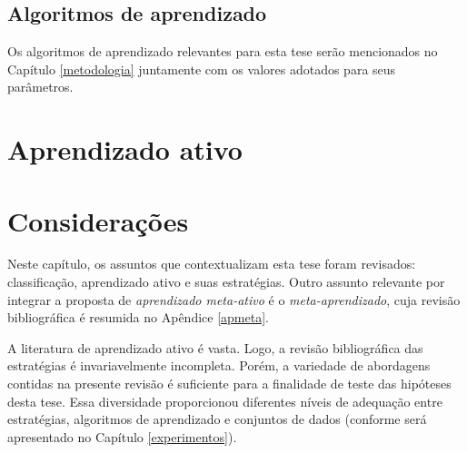   






% 
% 
% 
% 
% 
%  
% 
% 
% 
% 
% 
% 
% 
% 
% 
% 
% 
% 
% 
% 
% 
% 
% 



\subsection{Algoritmos de aprendizado}\label{algs}
Os algoritmos de aprendizado relevantes para esta tese serão mencionados no Capítulo \ref{metodologia} juntamente com os valores adotados para seus parâmetros.

\section{Aprendizado ativo} \label{aprendizado-ativo}


\section{Considerações}\label{contcons}
Neste capítulo, os assuntos que contextualizam esta tese foram revisados:
classificação, aprendizado ativo e suas estratégias.
Outro assunto relevante por integrar a proposta de \textit{aprendizado meta-ativo} é o \textit{meta-aprendizado}, cuja revisão bibliográfica é resumida no Apêndice \ref{apmeta}.

A literatura de aprendizado ativo é vasta.
Logo, a revisão bibliográfica das estratégias é invariavelmente incompleta.
Porém, a variedade de abordagens contidas na presente revisão é suficiente para a finalidade de teste das hipóteses desta tese.
Essa diversidade proporcionou diferentes níveis de adequação entre estratégias, algoritmos de aprendizado e conjuntos de dados (conforme será apresentado no Capítulo \ref{experimentos}).

